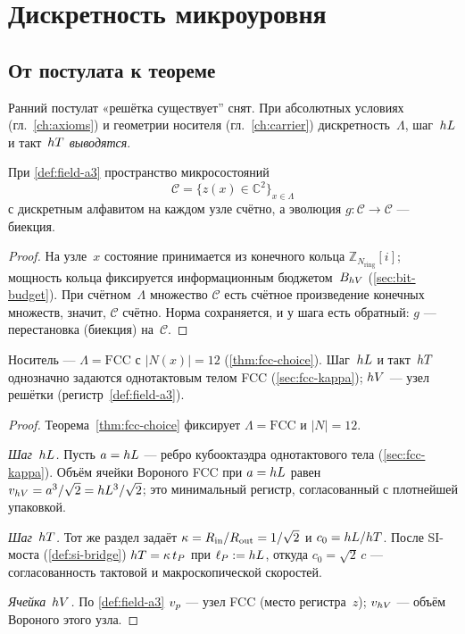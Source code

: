 \chapter{Дискретность микроуровня}
\label{ch:foundations}

\section{От постулата к теореме}

Ранний постулат «решётка существует'' снят.
При абсолютных условиях (гл.~\ref{ch:axioms}) и геометрии носителя (гл.~\ref{ch:carrier})
дискретность~$\Lambda$, шаг~$hL$ и такт~$hT$ \emph{выводятся}.

\begin{lemma}
\label{lem:countable-config}
При \cref{def:field-a3} пространство микросостояний
\[
  \mathcal{C}=\bigl\{z(x)\in\mathbb{C}^2\bigr\}_{x\in\Lambda}
\]
с дискретным алфавитом на каждом узле счётно, а эволюция $g:\mathcal{C}\to\mathcal{C}$ --- биекция.
\end{lemma}

\begin{proof}
На узле~$x$ состояние принимается из конечного кольца $\mathbb{Z}_{N_{\mathrm{ring}}}[i]$;
мощность кольца фиксируется информационным бюджетом~$B_{hV}$ (\cref{sec:bit-budget}).
При счётном~$\Lambda$ множество $\mathcal{C}$ есть счётное произведение конечных множеств, значит, $\mathcal{C}$ счётно.
Норма сохраняется, и у шага есть обратный:
$g$ --- перестановка (биекция) на~$\mathcal{C}$.
\end{proof}

\begin{lemma}
\label{lem:fcc-scale}
Носитель --- $\Lambda=\mathrm{FCC}$ с $|N(x)|=12$ (\cref{thm:fcc-choice}).
Шаг~$hL$ и такт~$hT$ однозначно задаются однотактовым телом FCC (\cref{sec:fcc-kappa});
$hV$ --- узел решётки (регистр~\cref{def:field-a3}).
\end{lemma}

\begin{proof}
Теорема~\ref{thm:fcc-choice} фиксирует $\Lambda=\mathrm{FCC}$ и $|N|=12$.

\smallskip
\emph{Шаг~$hL$.}
Пусть $a=hL$ --- ребро кубооктаэдра однотактового тела (\cref{sec:fcc-kappa}).
Объём ячейки Вороного FCC при $a=hL$ равен $v_{hV}=a^3/\sqrt{2}=hL^3/\sqrt{2}$;
это минимальный регистр, согласованный с плотнейшей упаковкой.

\smallskip
\emph{Шаг~$hT$.}
Тот же раздел задаёт $\kappa=R_{\mathrm{in}}/R_{\mathrm{out}}=1/\sqrt{2}$ и
$c_0=hL/hT$.
После SI-моста (\cref{def:si-bridge}) $hT=\kappa\,t_P$ при $\ell_P:=hL$,
откуда $c_0=\sqrt{2}\,c$ --- согласованность тактовой и макроскопической скоростей.

\smallskip
\emph{Ячейка~$hV$.}
По \cref{def:field-a3} $v_p$ --- узел FCC (место регистра~$z$); $v_{hV}$ --- объём Вороного этого узла.
\end{proof}

